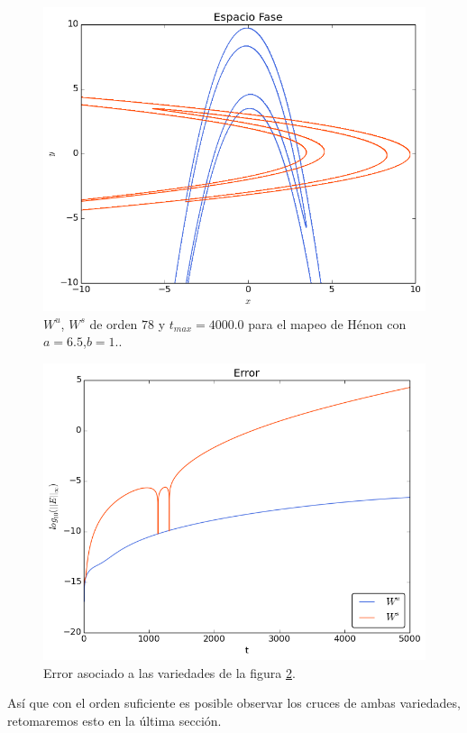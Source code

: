 \begin{figure}[H]
\centering
\includegraphics[scale=0.6]{henon3}
\caption{$W^{u}$, $W^{s}$ de orden $78$ y $t_{max}=4000.0$ para el mapeo de Hénon con $a=6.5$,$b=1.$.}
\label{Henon3}
\end{figure}

\begin{figure}[H]
\centering
\includegraphics[scale=0.6]{ErrorHenon3}
\caption{Error asociado a las variedades de la figura \ref{Henon3}.}
\label{Henon3}
\end{figure}


Así que con el orden suficiente es posible observar los cruces de ambas variedades, retomaremos esto en la última sección. 

